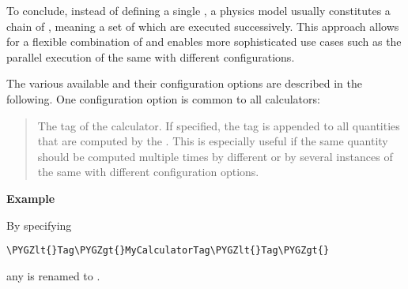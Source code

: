\documentclass[letterpaper,10pt,english]{sphinxmanual}
\def\PYGZlt{\char`\<}
\def\PYGZgt{\char`\>}
\begin{document}
To conclude, instead of defining a single , a physics model usually constitutes a
chain of , meaning a set of  which are executed successively. This
approach allows for a flexible combination of  and enables more sophisticated use
cases such as the parallel execution of the same  with different configurations.

The various available  and their configuration options are described in the
following. One configuration option is common to all calculators:

\begin{quote}

The tag of the calculator. If specified, the tag is appended to all quantities that are computed
by the . This is especially useful if the same quantity should be computed multiple
times by different  or by several instances of the same  with
different configuration options.
\end{quote}

\textbf{Example}

By specifying

\begin{Verbatim}[commandchars=\\\{\}]
\PYGZlt{}Tag\PYGZgt{}MyCalculatorTag\PYGZlt{}Tag\PYGZgt{}
\end{Verbatim}

any  is renamed to .
\end{document}
